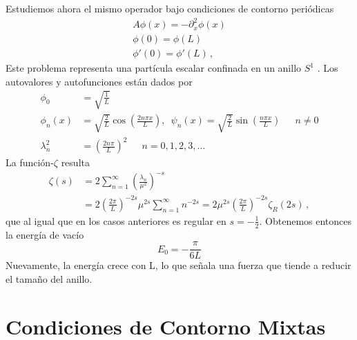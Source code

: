 Estudiemos ahora el mismo operador bajo condiciones de contorno periódicas
\begin{equation}
\begin{array}{c}
	A \phi (x) = - \partial _x ^2 \phi (x) \\[5pt]
    \phi (0) = \phi (L)  \\[5pt]
    \phi ' (0) = \phi ' (L) \, ,
\end{array}
\end{equation}
Este problema representa una partícula escalar confinada en un anillo $S ^1$ .
Los autovalores y autofunciones están dados por
\begin{align}
	\phi _{0} &= \sqrt{\frac{1}{L}} \\[5pt]
	\phi _{n} (x) &= \sqrt{\frac{2}{L}} \cos \left( \frac{2 n \pi x}{L} \right),
	\, \, \,  \psi _n (x) =\sqrt{\frac{2}{L}} \sin \left( \frac{n \pi x}{L} \right) 
	\, \, \, \, \, \, \, \, \, n \neq 0
	\\[5pt]
	\lambda ^2 _n  &= \left( \frac{2 n \pi }{L} \right) ^2 
	\, \, \, \, \, \, \, \, \,
	 n = 0,1,2,3, \dots
\end{align}
La función-$\zeta$ resulta
\begin{equation}
\begin{aligned}
\zeta  (s) &= 
2 \sum _{n=1} ^{\infty} \left( \frac{\lambda _n}{\mu ^2} \right)^{-s} \\[5pt]
&=  2 \left( \frac{2 \pi}{L} \right) ^{-2s} \mu ^{2s} \sum _{n=1} ^{\infty} n ^{-2s} =  
2 \mu ^{2s} \left( \frac{2 \pi}{L} \right) ^{-2s} \zeta _R (2s)
\, ,
\end{aligned}
\end{equation}
que al igual que en los casos anteriores es regular en $s=- \frac{1}{2}$. Obtenemos
entonces la energía de vacío
\begin{equation}
E _0 = - \frac{\pi}{6 L}
\end{equation}
Nuevamente, la energía crece con L, lo que señala una fuerza que tiende a
reducir el tamaño del anillo.

\section{Condiciones de Contorno Mixtas}


